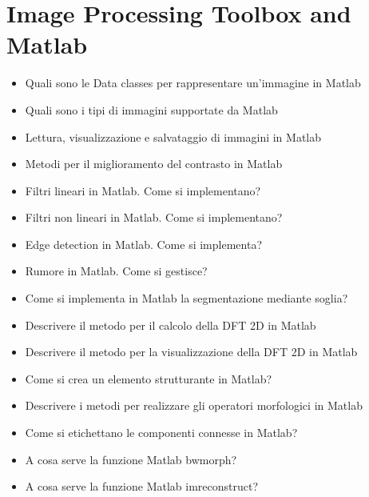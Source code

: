 \section{Image Processing Toolbox and Matlab}
\begin{itemize}
	\item Quali sono le Data classes per rappresentare un’immagine in Matlab
	\item Quali sono i tipi di immagini supportate da Matlab
	\item Lettura, visualizzazione e salvataggio di immagini in Matlab
	\item Metodi per il miglioramento del contrasto in Matlab
	\item Filtri lineari in Matlab. Come si implementano?
	\item Filtri non lineari in Matlab. Come si implementano?
	\item Edge detection in Matlab. Come si implementa?
	\item Rumore in Matlab. Come si gestisce?
	\item Come si implementa in Matlab la segmentazione mediante soglia?
	\item Descrivere il metodo per il calcolo della DFT 2D in Matlab
	\item Descrivere il metodo per la visualizzazione della DFT 2D in Matlab
	\item Come si crea un elemento strutturante in Matlab?
	\item Descrivere i metodi per realizzare gli operatori morfologici in Matlab
	\item Come si etichettano le componenti connesse in Matlab?
	\item A cosa serve la funzione Matlab bwmorph?
	\item A cosa serve la funzione Matlab imreconstruct?
\end{itemize}